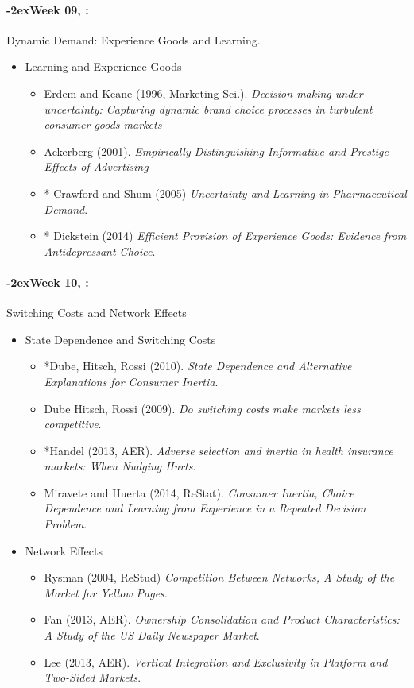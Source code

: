 \documentclass[11pt]{article}
\newcommand{\week}[1]{%
  \paragraph*{\kern-2ex\quad #1, \syldate{\today}:}%
  \ifdim\wd1=\wd\THURSDAY
    \AdvanceDate[7]
  \else
    \AdvanceDate[7]
  \fi%
}
\begin{document}
\week{Week 09} Dynamic Demand: Experience Goods and Learning.
\begin{itemize}
\item Learning and Experience Goods
\begin{itemize}
\item Erdem and Keane (1996, Marketing Sci.). \textit{Decision-making under uncertainty: Capturing dynamic brand choice processes in turbulent consumer goods markets}
\item Ackerberg (2001). \textit{Empirically Distinguishing Informative and Prestige Effects of Advertising}
\item * Crawford and Shum (2005) \textit{Uncertainty and Learning in Pharmaceutical Demand}.
\item * Dickstein (2014) \textit{Efficient Provision of Experience Goods: Evidence from Antidepressant Choice}.
\end{itemize}
\end{itemize}

\week{Week 10} Switching Costs and Network Effects
\begin{itemize}
\item State Dependence and Switching Costs
\begin{itemize}
\item *Dube, Hitsch, Rossi (2010). \textit{State Dependence and Alternative Explanations for Consumer Inertia}.
\item Dube Hitsch, Rossi (2009). \textit{Do switching costs make markets less competitive}.
\item *Handel (2013, AER). \textit{Adverse selection and inertia in health insurance markets: When Nudging Hurts}.
\item Miravete and Huerta (2014, ReStat). \textit{Consumer Inertia, Choice Dependence and Learning from Experience in a Repeated Decision Problem}.
\end{itemize}
\item Network Effects
\begin{itemize}
\item Rysman (2004, ReStud) \textit{Competition Between Networks, A Study of the Market for Yellow Pages}.
\item Fan (2013, AER). \textit{Ownership Consolidation and Product Characteristics: A Study of the US Daily Newspaper Market}.
\item Lee (2013, AER). \textit{Vertical Integration and Exclusivity in Platform and Two-Sided Markets}.
\end{itemize}
\end{itemize}
\end{document}
